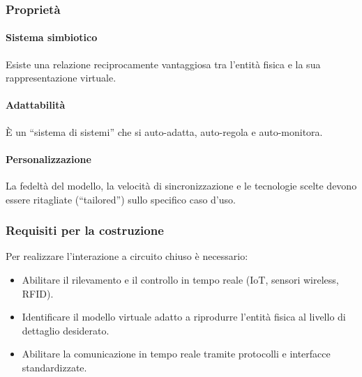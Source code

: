 \subsubsection{Proprietà}
%
\paragraph{Sistema simbiotico} Esiste una relazione reciprocamente vantaggiosa tra l'entità fisica e la sua rappresentazione virtuale.
%
\paragraph{Adattabilità} È un ``sistema di sistemi'' che si auto-adatta, auto-regola e auto-monitora.
%
\paragraph{Personalizzazione} La fedeltà del modello, la velocità di sincronizzazione e le tecnologie scelte devono essere ritagliate (``tailored'') sullo specifico caso d'uso.

\subsubsection{Requisiti per la costruzione}
Per realizzare l'interazione a circuito chiuso è necessario:
\begin{itemize}
    \item Abilitare il rilevamento e il controllo in tempo reale (IoT, sensori wireless, RFID).
    \item Identificare il modello virtuale adatto a riprodurre l'entità fisica al livello di dettaglio desiderato.
    \item Abilitare la comunicazione in tempo reale tramite protocolli e interfacce standardizzate.
\end{itemize}
